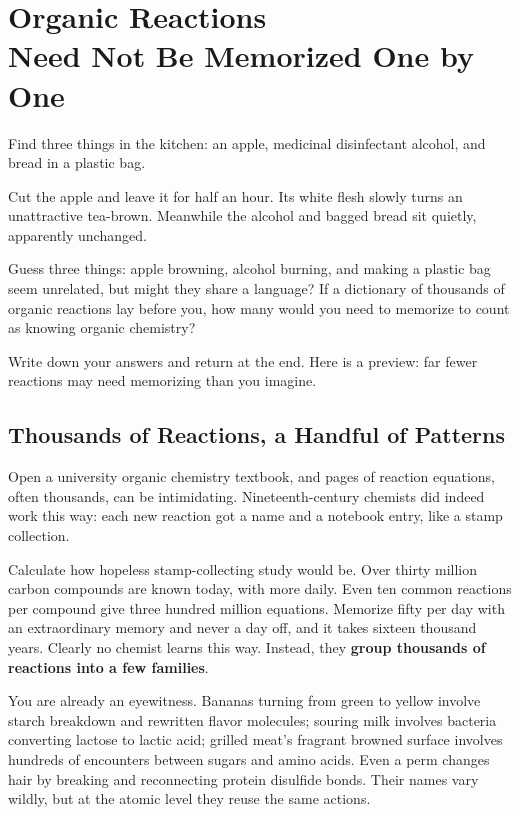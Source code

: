 \chapter[Organic Reactions Need Not Be Memorized One by One]{Organic Reactions\protect\\ Need Not Be Memorized One by One}

\begin{kaichang}
Find three things in the kitchen: an apple, medicinal disinfectant alcohol, and bread in a plastic bag.

Cut the apple and leave it for half an hour. Its white flesh slowly turns an unattractive tea-brown. Meanwhile the alcohol and bagged bread sit quietly, apparently unchanged.

Guess three things: apple browning, alcohol burning, and making a plastic bag seem unrelated, but might they share a language? If a dictionary of thousands of organic reactions lay before you, how many would you need to memorize to count as knowing organic chemistry?

Write down your answers and return at the end. Here is a preview: far fewer reactions may need memorizing than you imagine.
\end{kaichang}

\section{Thousands of Reactions, a Handful of Patterns}

Open a university organic chemistry textbook, and pages of reaction equations, often thousands, can be intimidating. Nineteenth-century chemists did indeed work this way: each new reaction got a name and a notebook entry, like a stamp collection.

Calculate how hopeless stamp-collecting study would be. Over thirty million carbon compounds are known today, with more daily. Even ten common reactions per compound give three hundred million equations. Memorize fifty per day with an extraordinary memory and never a day off, and it takes sixteen thousand years. Clearly no chemist learns this way. Instead, they \textbf{group thousands of reactions into a few families}.

You are already an eyewitness. Bananas turning from green to yellow involve starch breakdown and rewritten flavor molecules; souring milk involves bacteria converting lactose to lactic acid; grilled meat's fragrant browned surface involves hundreds of encounters between sugars and amino acids. Even a perm changes hair by breaking and reconnecting protein disulfide bonds. Their names vary wildly, but at the atomic level they reuse the same actions.

